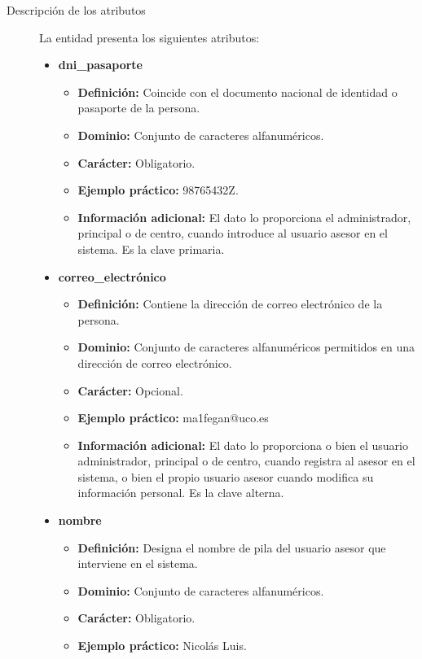 \begin{description}
   \item[Descripción de los atributos] La entidad presenta los siguientes
   atributos:

   \begin{itemize}
   \item \textbf{dni\_pasaporte}
      \begin{itemize}
         \item \textbf{Definición:} Coincide con el documento nacional de identidad o pasaporte de la persona.
         \item \textbf{Dominio:} Conjunto de caracteres alfanuméricos.
         \item \textbf{Carácter:} Obligatorio.
         \item \textbf{Ejemplo práctico:} 98765432Z.
         \item \textbf{Información adicional:} El dato lo proporciona el administrador, principal o de centro, cuando introduce al usuario asesor en el sistema. Es la clave primaria.
      \end{itemize}
   \item \textbf{correo\_electrónico}
      \begin{itemize}
         \item \textbf{Definición:} Contiene la dirección de correo electrónico de la persona.
         \item \textbf{Dominio:} Conjunto de caracteres alfanuméricos permitidos en una dirección de correo electrónico.
         \item \textbf{Carácter:} Opcional.
         \item \textbf{Ejemplo práctico:} ma1fegan@uco.es
         \item \textbf{Información adicional:} El dato lo proporciona o bien el usuario administrador, principal o de centro, cuando registra al asesor en el sistema, o bien el propio usuario asesor cuando modifica su información personal. Es la clave alterna.
      \end{itemize}
   \item \textbf{nombre}
      \begin{itemize}
         \item \textbf{Definición:} Designa el nombre de pila del usuario asesor que interviene en el sistema.
         \item \textbf{Dominio:} Conjunto de caracteres alfanuméricos.
         \item \textbf{Carácter:} Obligatorio.
         \item \textbf{Ejemplo práctico:} Nicolás Luis.

\end{itemize}
\end{itemize}
\end{description}
